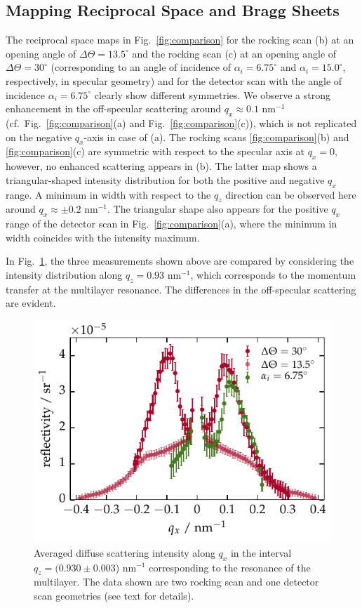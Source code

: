 \subsection{Mapping Reciprocal Space and Bragg Sheets}
The reciprocal space maps in Fig.~\ref{fig:comparison} for the rocking scan (b) at an opening angle of $\Delta \Theta = 13.5^\circ$ and the rocking scan (c) at an opening angle of $\Delta \Theta = 30^\circ$ (corresponding to an angle of incidence of $\alpha_i = 6.75^\circ$ and $\alpha_i = 15.0^\circ$, respectively, in specular geometry) and for the detector scan with the angle of incidence $\alpha_i = 6.75^\circ$ clearly show different symmetries. We observe a strong enhancement in the off-specular scattering around $q_x\approx0.1$ nm$^{-1}$ (cf.~Fig.~\ref{fig:comparison}(a) and Fig.~\ref{fig:comparison}(c)), which is not replicated on the negative $q_x$-axis in case of (a). The rocking scans \ref{fig:comparison}(b) and \ref{fig:comparison}(c) are symmetric with respect to the specular axis at $q_x=0$, however, no enhanced scattering appears in (b). The latter map shows a triangular-shaped intensity distribution for both the positive and 
negative $q_x$ range. A minimum in width with respect to the $q_z$ direction can be observed here around $q_x \approx \pm 0.2$ nm$^{-1}$. The triangular shape also appears for the 
positive $q_x$ range 
of the detector scan in Fig.~\ref{fig:comparison}(a), where the minimum in width coincides with the intensity maximum.


In Fig.~\ref{fig:BraggSheet_DetectorAndRocking}, the three measurements shown above are compared by considering the intensity distribution along $q_z=0.93$ nm$^{-1}$, which corresponds to the momentum transfer at the multilayer resonance. The differences in the off-specular scattering are evident. 
\begin{figure}[htbp]
	\includegraphics{img/PTB17_diffuse_BraggSheet_DetectorAndRocking} \caption{Averaged diffuse scattering intensity along $q_x$ in the interval  $q_z=(0.930 \pm 0.003$) nm$^{-1}$ corresponding to the resonance of the multilayer. The data shown are two rocking scan and one detector scan geometries (see text for details).} \label{fig:BraggSheet_DetectorAndRocking} 
\end{figure}

